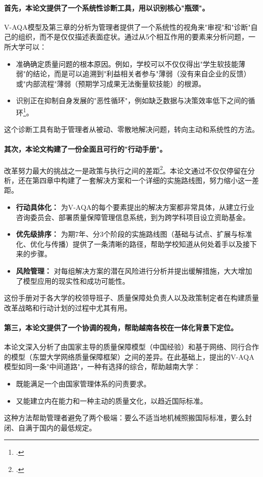 \paragraph{首先，本论文提供了一个系统性诊断工具，用以识别核心"瓶颈"。}
V-AQA模型及第三章的分析为管理者提供了一个系统性的视角来"审视"和"诊断"自己的组织，而不是仅仅描述表面症状。通过从5个相互作用的要素来分析问题，一所大学可以：
\begin{itemize}
    \item 准确确定质量问题的根本原因。例如，学校可以不仅仅得出"学生软技能薄弱"的结论，而是可以追溯到"利益相关者参与"薄弱（没有来自企业的反馈）或"内部流程"薄弱（预期学习成果无法衡量软技能）的根源。
    \item 识别正在抑制自身发展的"恶性循环"，例如缺乏数据与决策效率低下之间的循环\footcite{aunsec_redesigningIQA}。
\end{itemize}
这个诊断工具有助于管理者从被动、零散地解决问题，转向主动和系统性的方法。

\paragraph{其次，本论文构建了一份全面且可行的"行动手册"。}
改革努力最大的挑战之一是政策与执行之间的差距\footcite{OECD_PolicyToAction}。本论文通过不仅仅停留在分析，还在第四章中构建了一套解决方案和一个详细的实施路线图，努力缩小这一差距。
\begin{itemize}
    \item \textbf{行动具体化：} 为V-AQA的每个要素提出的解决方案都非常具体，从建立行业咨询委员会、部署质量保障管理信息系统，到为跨学科项目设立资助基金。
    \item \textbf{优先级排序：} 为期7年、分3个阶段的实施路线图（基础与试点、扩展与标准化、优化与传播）提供了一条清晰的路径，帮助学校知道从何处着手以及接下来的步骤。
    \item \textbf{风险管理：} 对每组解决方案的潜在风险进行分析并提出缓解措施，大大增加了模型应用的现实性和成功可能性。
\end{itemize}
这份手册对于各大学的校领导班子、质量保障处负责人以及政策制定者在构建质量改革战略和行动计划的过程中尤其有用。

\paragraph{第三，本论文提供了一个协调的视角，帮助越南各校在一体化背景下定位。}
本论文深入分析了由国家主导的质量保障模型（中国经验）和基于网络、同行合作的模型（东盟大学网络质量保障框架）之间的差异。在此基础上，提出的V-AQA模型如同一条"中间道路"，一种有选择的综合，帮助越南大学：
\begin{itemize}
    \item 既能满足一个由国家管理体系的问责要求。
    \item 又能建立内在能力和一种主动的质量文化，以趋近国际标准。
\end{itemize}
这种方法帮助管理者避免了两个极端：要么不适当地机械照搬国际标准，要么封闭、自满于国内的最低规定。

